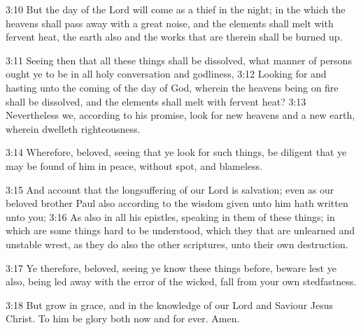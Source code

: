 3:10 But the day of the Lord will come as a thief in the night; in the which the heavens shall pass away with a great noise, and the elements shall melt with fervent heat, the earth also and the works that are therein shall be burned up.

3:11 Seeing then that all these things shall be dissolved, what manner of persons ought ye to be in all holy conversation and godliness, 3:12 Looking for and hasting unto the coming of the day of God, wherein the heavens being on fire shall be dissolved, and the elements shall melt with fervent heat?  3:13 Nevertheless we, according to his promise, look for new heavens and a new earth, wherein dwelleth righteousness.

3:14 Wherefore, beloved, seeing that ye look for such things, be diligent that ye may be found of him in peace, without spot, and blameless.

3:15 And account that the longsuffering of our Lord is salvation; even as our beloved brother Paul also according to the wisdom given unto him hath written unto you; 3:16 As also in all his epistles, speaking in them of these things; in which are some things hard to be understood, which they that are unlearned and unstable wrest, as they do also the other scriptures, unto their own destruction.

3:17 Ye therefore, beloved, seeing ye know these things before, beware lest ye also, being led away with the error of the wicked, fall from your own stedfastness.

3:18 But grow in grace, and in the knowledge of our Lord and Saviour Jesus Christ. To him be glory both now and for ever. Amen.

